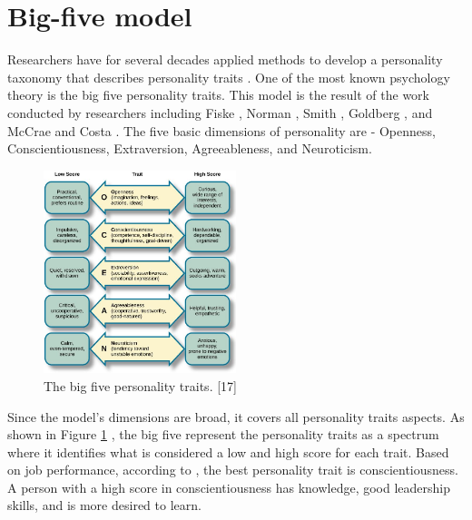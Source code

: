 \section{Big-five model}
Researchers have for several decades applied methods to develop a personality taxonomy that describes personality traits \cite{personality_goldberg_1990}. One of the most known psychology theory is the big five personality traits. This model is the result of the work conducted by researchers including Fiske \cite{fiske1949consistency}, Norman \cite{norman19672800}, Smith \cite{smith1967usefulness}, Goldberg \cite{goldberg1981language}, and McCrae and Costa \cite{mccrae1987validation}. The five basic dimensions of personality are - Openness, Conscientiousness, Extraversion, Agreeableness, and Neuroticism. 
%
\begin{figure}[h]
  \centering
  \includegraphics[width=0.5\textwidth]{figures/big-5-personality.jpeg}
  \caption{The big five personality traits. [17]}
  \label{fig:big5}
\end{figure}
%
Since the model's dimensions are broad, it covers all personality traits aspects. As shown in Figure \ref{fig:big5} \cite{big5-image}, the big five  represent the personality traits as a spectrum where it identifies what is considered a low and high score for each trait. Based on job performance, according to \cite{best_trait}, the best personality trait is conscientiousness. A person with a high score in conscientiousness has knowledge, good leadership skills, and is more desired to learn.

